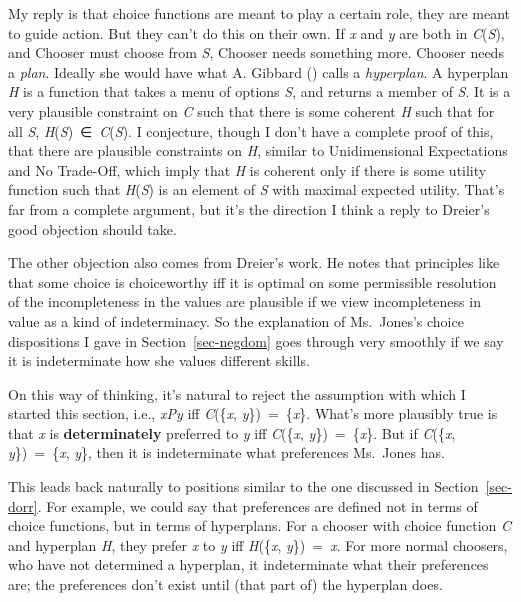 \documentclass[
  11pt,
  letterpaper,
  DIV=11,
  numbers=noendperiod,
  twoside]{scrartcl}
\begin{document}
My reply is that choice functions are meant to play a certain role, they
are meant to guide action. But they can't do this on their own. If
\emph{x} and \emph{y} are both in \emph{C}(\emph{S}), and Chooser must
choose from \emph{S}, Chooser needs something more. Chooser needs a
\emph{plan}. Ideally she would have what A. Gibbard
() calls a \emph{hyperplan}. A hyperplan
\emph{H} is a function that takes a menu of options \emph{S}, and
returns a member of \emph{S}. It is a very plausible constraint on
\emph{C} such that there is some coherent \emph{H} such that for all
\emph{S}, \emph{H}(\emph{S})~∈~\emph{C}(\emph{S}). I conjecture, though
I don't have a complete proof of this, that there are plausible
constraints on \emph{H}, similar to Unidimensional Expectations and No
Trade-Off, which imply that \emph{H} is coherent only if there is some
utility function such that \emph{H}(\emph{S}) is an element of \emph{S}
with maximal expected utility. That's far from a complete argument, but
it's the direction I think a reply to Dreier's good objection should
take.

The other objection also comes from Dreier's work. He notes that
principles like that some choice is choiceworthy iff it is optimal on
some permissible resolution of the incompleteness in the values are
plausible if we view incompleteness in value as a kind of indeterminacy.
So the explanation of Ms.~Jones's choice dispositions I gave in
Section~\ref{sec-negdom} goes through very smoothly if we say it is
indeterminate how she values different skills.

On this way of thinking, it's natural to reject the assumption with
which I started this section, i.e., \emph{xPy} iff \emph{C}(\{\emph{x},
\emph{y}\})~=~\{\emph{x}\}. What's more plausibly true is that \emph{x}
is \textbf{determinately} preferred to \emph{y} iff \emph{C}(\{\emph{x},
\emph{y}\})~=~\{\emph{x}\}. But if \emph{C}(\{\emph{x},
\emph{y}\})~=~\{\emph{x}, \emph{y}\}, then it is indeterminate what
preferences Ms.~Jones has.

This leads back naturally to positions similar to the one discussed in
Section~\ref{sec-dorr}. For example, we could say that preferences are
defined not in terms of choice functions, but in terms of hyperplans.
For a chooser with choice function \emph{C} and hyperplan \emph{H}, they
prefer \emph{x} to \emph{y} iff \emph{H}(\{\emph{x},
\emph{y}\})~=~\emph{x}. For more normal choosers, who have not
determined a hyperplan, it indeterminate what their preferences are; the
preferences don't exist until (that part of) the hyperplan does.
\end{document}
